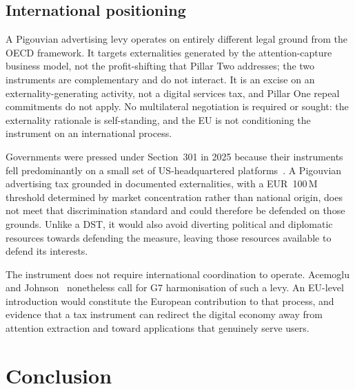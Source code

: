 \documentclass[../../main]{subfiles}
\begin{document}

\subsection{International positioning}


A Pigouvian advertising levy operates on entirely different legal ground from the OECD framework.
It targets externalities generated by the attention-capture business model, not the profit-shifting that Pillar Two addresses; the two instruments are complementary and do not interact.
It is an excise on an externality-generating activity, not a digital services tax, and Pillar One repeal commitments do not apply.
No multilateral negotiation is required or sought: the externality rationale is self-standing, and the EU is not conditioning the instrument on an international process.

Governments were pressed under Section~301 in 2025 because their instruments fell predominantly on a small set of US-headquartered platforms~\citep{ustr_section301_dst}. 
A Pigouvian advertising tax grounded in documented externalities, with a EUR~100\,M threshold determined by market concentration rather than national origin, does not meet that discrimination standard and could therefore be defended on those grounds. 
Unlike a DST, it would also avoid diverting political and diplomatic resources towards defending the measure, leaving those resources available to defend its interests.


The instrument does not require international coordination to operate.
Acemoglu and Johnson~\citep{acemoglu_johnson_2024_ad_tax} nonetheless call for G7 harmonisation of such a levy. %
An EU-level introduction would constitute the European contribution to that process, and evidence that a tax instrument can redirect the digital economy away from attention extraction and toward applications that genuinely serve users.


\section*{Conclusion}
\end{document}
